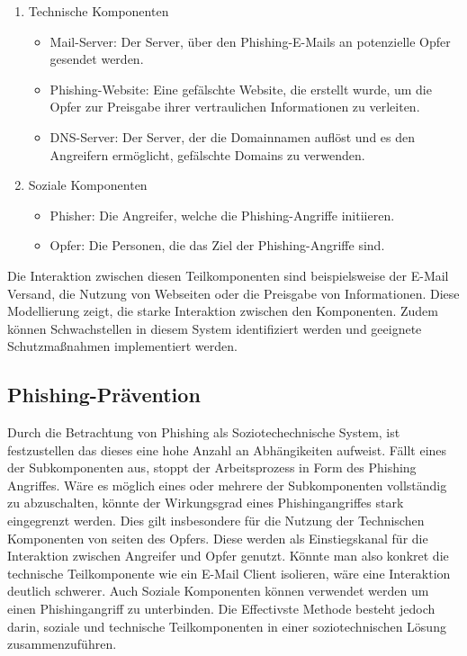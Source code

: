 \documentclass[journal=tosc,final]{iacrtrans}
\begin{document}
\begin{enumerate}
\item Technische Komponenten
\begin{itemize}
\item Mail-Server: Der Server, über den Phishing-E-Mails an potenzielle Opfer gesendet werden.
\item Phishing-Website: Eine gefälschte Website, die erstellt wurde, um die Opfer zur Preisgabe ihrer vertraulichen Informationen zu verleiten.
\item DNS-Server: Der Server, der die Domainnamen auflöst und es den Angreifern ermöglicht, gefälschte Domains zu verwenden.
\end{itemize}
\item Soziale Komponenten
\begin{itemize}
\item Phisher: Die Angreifer, welche die Phishing-Angriffe initiieren.
\item Opfer: Die Personen, die das Ziel der Phishing-Angriffe sind.
\end{itemize}
\end{enumerate}
Die Interaktion zwischen diesen Teilkomponenten sind beispielsweise der E-Mail Versand, die Nutzung von Webseiten oder die Preisgabe von Informationen. Diese Modellierung zeigt, die starke Interaktion zwischen den Komponenten. Zudem können Schwachstellen in diesem System identifiziert werden und geeignete Schutzmaßnahmen implementiert werden.
\subsection{Phishing-Prävention}
Durch die Betrachtung von Phishing als Soziotechechnische System, ist festzustellen das dieses eine hohe Anzahl an Abhängikeiten aufweist. Fällt eines der Subkomponenten aus, stoppt der Arbeitsprozess in Form des Phishing Angriffes. Wäre es möglich eines oder mehrere der Subkomponenten vollständig zu abzuschalten, könnte der Wirkungsgrad eines Phishingangriffes stark eingegrenzt werden. Dies gilt insbesondere für die Nutzung der Technischen Komponenten von seiten des Opfers. Diese werden als Einstiegskanal für die Interaktion zwischen Angreifer und Opfer genutzt. Könnte man also konkret die technische Teilkomponente wie ein E-Mail Client isolieren, wäre eine Interaktion deutlich schwerer. Auch Soziale Komponenten können verwendet  werden um einen Phishingangriff zu unterbinden. Die Effectivste Methode besteht jedoch darin, soziale und technische Teilkomponenten in einer soziotechnischen Lösung zusammenzuführen.
\end{document}
